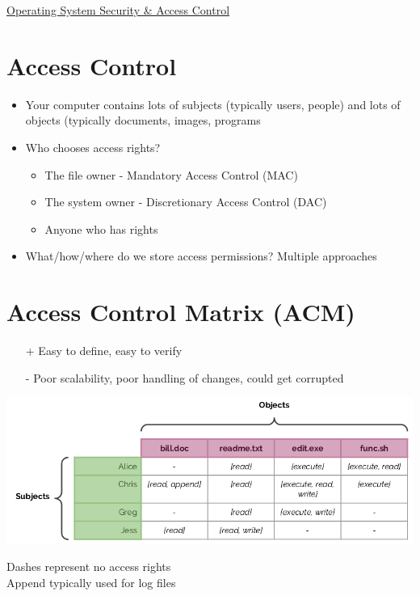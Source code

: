 \documentclass{article}[18pt]
\begin{document}
\begin{center}
\underline{\huge Operating System Security \& Access Control}
\end{center}
\section{Access Control}
\begin{itemize}
	\item Your computer contains lots of subjects (typically users, people) and lots of objects (typically documents, images, programs
	\item Who chooses access rights?
	\begin{itemize}
		\item The file owner - Mandatory Access Control (MAC)
		\item The system owner - Discretionary Access Control (DAC)
		\item Anyone who has rights
	\end{itemize}
	\item What/how/where do we store access permissions? Multiple approaches
\end{itemize}
\section{Access Control Matrix (ACM)}
\begin{itemize}
	\item [+] Easy to define, easy to verify
	\item [-] Poor scalability, poor handling of changes, could get corrupted
\end{itemize}
\begin{center}
	\includegraphics[scale=0.7]{ACM}
\end{center}
Dashes represent no access rights\\
Append typically used for log files
\end{document}
